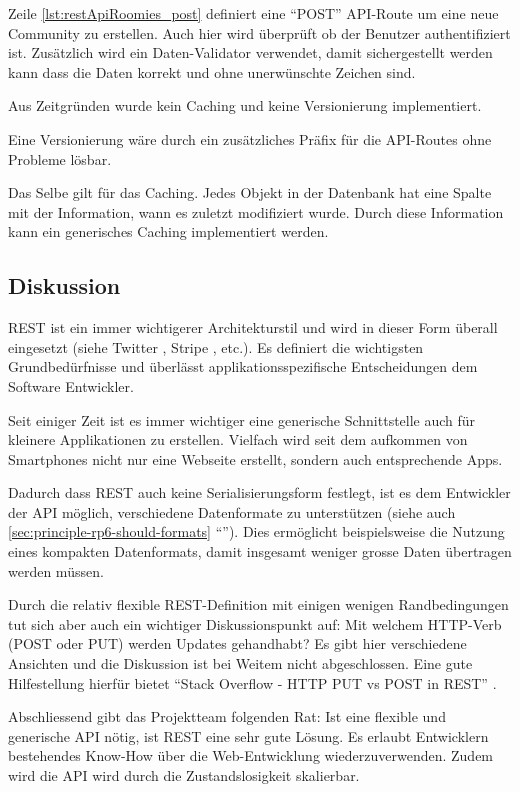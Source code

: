 Zeile \autoref{lst:restApiRoomies_post} definiert eine ``POST'' API-Route um eine neue Community zu erstellen. Auch hier wird überprüft ob der Benutzer authentifiziert ist. Zusätzlich wird ein Daten-Validator verwendet, damit sichergestellt werden kann dass die Daten korrekt und ohne unerwünschte Zeichen sind.

Aus Zeitgründen wurde kein Caching und keine Versionierung implementiert.

Eine Versionierung wäre durch ein zusätzliches Präfix für die API-Routes ohne Probleme lösbar.

Das Selbe gilt für das Caching. Jedes Objekt in der Datenbank hat eine Spalte mit der Information, wann es zuletzt modifiziert wurde. Durch diese Information kann ein generisches Caching implementiert werden.

\subsection*{Diskussion}

REST ist ein immer wichtigerer Architekturstil und wird in dieser Form überall eingesetzt (siehe Twitter \cite{TwitterAPI}, Stripe \cite{StripeAPI}, etc.). Es definiert die wichtigsten Grundbedürfnisse und überlässt applikationsspezifische Entscheidungen dem Software Entwickler.

Seit einiger Zeit ist es immer wichtiger eine generische Schnittstelle auch für kleinere Applikationen zu erstellen. Vielfach wird seit dem aufkommen von Smartphones nicht nur eine Webseite erstellt, sondern auch entsprechende Apps.

Dadurch dass REST auch keine Serialisierungsform festlegt, ist es dem Entwickler der API möglich, verschiedene Datenformate zu unterstützen (siehe auch \ref{sec:principle-rp6-should-formats} ``''). Dies ermöglicht beispielsweise die Nutzung eines kompakten Datenformats, damit insgesamt weniger grosse Daten übertragen werden müssen.

Durch die relativ flexible REST-Definition mit einigen wenigen Randbedingungen tut sich aber auch ein wichtiger Diskussionspunkt auf: Mit welchem HTTP-Verb (POST oder PUT) werden Updates gehandhabt? Es gibt hier verschiedene Ansichten und die Diskussion ist bei Weitem nicht abgeschlossen. Eine gute Hilfestellung hierfür bietet ``Stack Overflow - HTTP PUT vs POST in REST'' \cite{StackoverflowPUTvsPOST}.

Abschliessend gibt das Projektteam folgenden Rat: Ist eine flexible und generische API nötig, ist REST eine sehr gute Lösung. Es erlaubt Entwicklern bestehendes Know-How über die Web-Entwicklung wiederzuverwenden. Zudem wird die API wird durch die Zustandslosigkeit skalierbar.